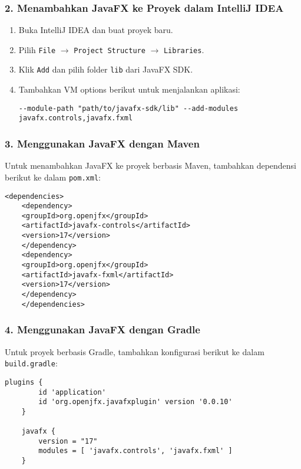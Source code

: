 \subsubsection{2. Menambahkan JavaFX ke Proyek dalam IntelliJ IDEA}

\begin{enumerate}
	\item Buka IntelliJ IDEA dan buat proyek baru.
	\item Pilih \texttt{File} $\to$ \texttt{Project Structure} $\to$ \texttt{Libraries}.
	\item Klik \texttt{Add} dan pilih folder \texttt{lib} dari JavaFX SDK.
	\item Tambahkan VM options berikut untuk menjalankan aplikasi:
	\begin{lstlisting}[style=JavaStyle, caption=Menambahkan JavaFX pada VM Options]
		--module-path "path/to/javafx-sdk/lib" --add-modules javafx.controls,javafx.fxml
	\end{lstlisting}
\end{enumerate}

\subsubsection{3. Menggunakan JavaFX dengan Maven}

Untuk menambahkan JavaFX ke proyek berbasis Maven, tambahkan dependensi berikut ke dalam \texttt{pom.xml}:

\begin{lstlisting}[style=XmlStyle, caption=Menambahkan JavaFX dalam Maven]
	<dependencies>
	<dependency>
	<groupId>org.openjfx</groupId>
	<artifactId>javafx-controls</artifactId>
	<version>17</version>
	</dependency>
	<dependency>
	<groupId>org.openjfx</groupId>
	<artifactId>javafx-fxml</artifactId>
	<version>17</version>
	</dependency>
	</dependencies>
\end{lstlisting}

\subsubsection{4. Menggunakan JavaFX dengan Gradle}

Untuk proyek berbasis Gradle, tambahkan konfigurasi berikut ke dalam \texttt{build.gradle}:

\begin{lstlisting}[style=JavaStyle, caption=Menambahkan JavaFX dalam Gradle]
	plugins {
		id 'application'
		id 'org.openjfx.javafxplugin' version '0.0.10'
	}
	
	javafx {
		version = "17"
		modules = [ 'javafx.controls', 'javafx.fxml' ]
	}
\end{lstlisting}

